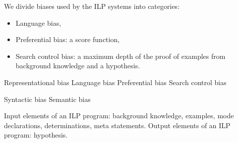 We divide biases used by the ILP systems into categories:
\begin{itemize}
\item Language bias,
\item Preferential bias: a score function,
\item Search control bias: a maximum depth of the proof of examples from background knowledge and a hypothesis.
\end{itemize}

Representational bias
Language bias
Preferential bias
Search control bias

Syntactic bias
Semantic bias

Input elements of an ILP program: background knowledge, examples, mode declarations, determinations, meta statements.
Output elements of an ILP program: hypothesis.

